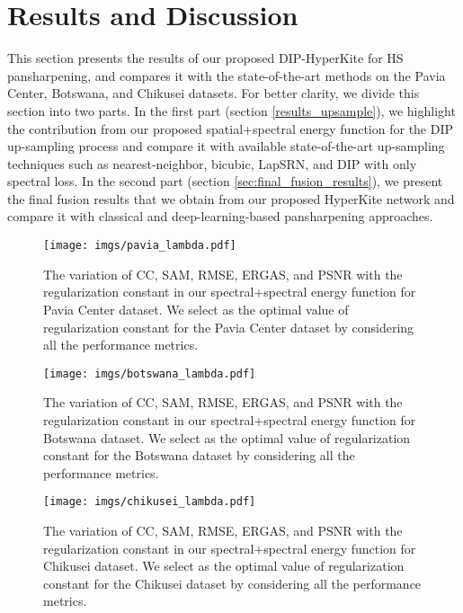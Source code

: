 \documentclass[journal]{IEEEtran}
\begin{document}
\section{Results and Discussion}
\label{sec: results}
This section presents the results of our proposed DIP-HyperKite for HS pansharpening, and compares it with the state-of-the-art methods on the Pavia Center, Botswana, and Chikusei datasets. For better clarity, we divide this section into two parts. In the first part (section \ref{results_upsample}), we highlight the contribution from our proposed spatial+spectral energy function for the DIP up-sampling process and compare it with available state-of-the-art up-sampling techniques such as  nearest-neighbor, bicubic, LapSRN, and DIP with only spectral loss. In the second part (section \ref{sec:final_fusion_results}), we present the final fusion results that we obtain from our proposed HyperKite network and compare it with classical and deep-learning-based pansharpening approaches. 
    \begin{figure}[tb]
            \centering
            \texttt{[image: imgs/pavia\_lambda.pdf]}
            \caption{The variation of CC, SAM, RMSE, ERGAS, and PSNR with the regularization constant  in our spectral+spectral energy function  for Pavia Center dataset. We select  as the optimal value of regularization constant for the Pavia Center dataset by considering all the performance metrics.}
            \label{fig:pavia_lambda_tune_ql}
    \end{figure}
    \begin{figure}[tb]
        \centering
        \texttt{[image: imgs/botswana\_lambda.pdf]}
        \caption{The variation of CC, SAM, RMSE, ERGAS, and PSNR with the regularization constant  in our spectral+spectral energy function  for Botswana dataset. We select  as the optimal value of regularization constant for the Botswana dataset by considering all the performance metrics.}
        \label{fig:botswana_lambda_tune_ql}
    \end{figure}
    \begin{figure}[tb]
        \centering
        \texttt{[image: imgs/chikusei\_lambda.pdf]}
        \caption{The variation of CC, SAM, RMSE, ERGAS, and PSNR with the regularization constant  in our spectral+spectral energy function  for Chikusei dataset. We select  as the optimal value of regularization constant for the Chikusei dataset by considering all the performance metrics.}
        \label{fig:chikusei_lambda_tune_ql}
    \end{figure}
    
\end{document}
